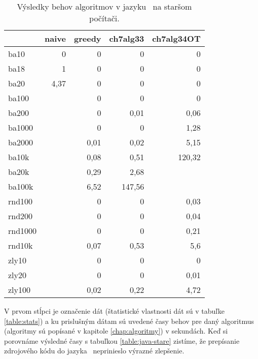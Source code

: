 \begin{table}[h]
	\centering
	\caption{Výsledky behov algoritmov v jazyku \cpp\ na staršom počítači.}
	\begin{tabular}{l|rrrr}
		\hline
		& naive & greedy & ch7alg33 & ch7alg34OT \\ \hline
		ba10    & 0     & 0      & 0        & 0          \\
		ba18    & 1     & 0      & 0        & 0          \\
		ba20    & 4,37  & 0      & 0        & 0          \\
		ba100   &       & 0      & 0        & 0          \\
		ba200   &       & 0      & 0,01     & 0,06       \\
		ba1000  &       & 0      & 0        & 1,28       \\
		ba2000  &       & 0,01   & 0,02     & 5,15       \\
		ba10k   &       & 0,08   & 0,51     & 120,32     \\
		ba20k   &       & 0,29   & 2,68     &            \\
		ba100k  &       & 6,52   & 147,56   &            \\
		rnd100  &       & 0      & 0        & 0,03       \\
		rnd200  &       & 0      & 0        & 0,04       \\
		rnd1000 &       & 0      & 0        & 0,21       \\
		rnd10k  &       & 0,07   & 0,53     & 5,6        \\
		zly10   &       & 0      & 0        & 0          \\
		zly20   &       & 0      & 0        & 0,01       \\
		zly100  &       & 0,02   & 0,22     & 4,72       \\ \hline
	\end{tabular}
	\bigskip\par
	V prvom stĺpci je označenie dát (štatistické vlastnosti dát sú v tabuľke 
	\ref{table:stats}) a ku prislušným dátam sú uvedené časy behov pre daný 
	algoritmus (algoritmy sú popísané v kapitole \ref{chap:algoritmy}) v 
	sekundách. Keď si porovnáme výsledné časy s tabuľkou 
	\ref{table:java-stare} zistíme, že prepísanie zdrojového kódu do jazyka 
	\cpp\ neprinieslo výrazné zlepšenie.
	\label{table:cpp}
\end{table}


